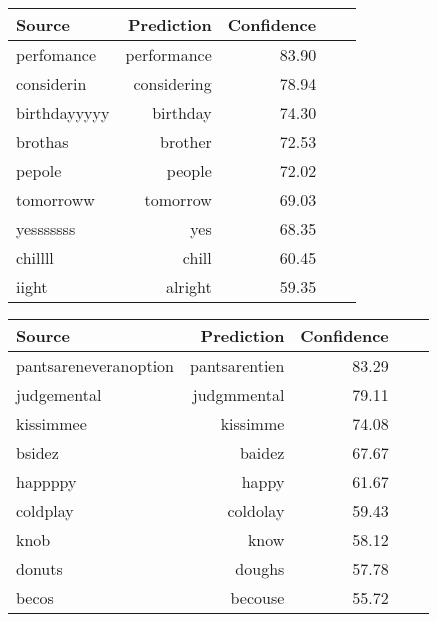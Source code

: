\documentclass[letterpaper]{article} \usepackage{aaai19}  \usepackage{times}  \usepackage{helvet} \usepackage{courier}  \usepackage[hyphens]{url}  \usepackage{graphicx} \urlstyle{rm} \def\UrlFont{\rm}  \usepackage{graphicx}  \frenchspacing  \setlength{\pdfpagewidth}{8.5in}  \setlength{\pdfpageheight}{11in}
\begin{document}
\begin{table*}[h]
\centering
\begin{minipage}{0.43\textwidth}
\begin{tabular}{lrrrr}
    \textbf{Source} & \textbf{Prediction} & \textbf{Confidence } \\
    \hline
   perfomance	& {\color{blue} performance}& 83.90 \\
   considerin & {\color{blue} considering} & 78.94 \\
   birthdayyyyy & {\color{blue} birthday} & 74.30 \\
   brothas & {\color{blue} brother} & 72.53 \\
   pepole & {\color{blue} people} & 72.02 \\
   tomorroww & {\color{blue} tomorrow} & 69.03 \\
   yesssssss & {\color{blue} yes} & 68.35 \\
   chillll & {\color{blue} chill} & 60.45 \\
   iight & {\color{blue} alright} & 59.35  \\
    \end{tabular}
    \end{minipage}
\begin{minipage}{0.43\textwidth}
  \begin{tabular}{lrrrr}
        \textbf{Source} & \textbf{Prediction} & \textbf{Confidence } \\
    \hline
   pantsareneveranoption	& {\color{red} pantsarentien}& 83.29 \\
   judgemental	& {\color{red} judgmmental}& 79.11 \\
   kissimmee	& {\color{red} kissimme}& 74.08 \\
   bsidez	& {\color{red} baidez}& 67.67 \\
   happppy	& {\color{red} happy}& 61.67 \\
   coldplay	& {\color{red} coldolay}& 59.43 \\
   knob	& {\color{red} know} & 58.12 \\
   donuts	& {\color{red} doughs} & 57.78 \\
   becos	& {\color{red} becouse}& 55.72 \\
   \end{tabular}
\end{minipage}
\caption{OOV words that our secondary character model has normalized correctly (blue) or incorrectly (red)}
  \label{table:confidence}
\end{table*}
\end{document}
